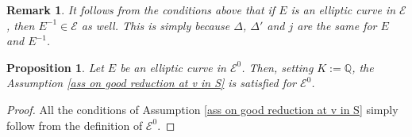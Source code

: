 \documentclass[12pt]{amsart}
\newtheorem{remark}[theorem]{Remark}
\newtheorem{proposition}[theorem]{Proposition}
\newcommand{\cE}{\mathcal{E}}
\newcommand{\Q}{\mathbb{Q}}
\numberwithin{equation}{section}
\begin{document}
\begin{remark}
    It follows from the conditions above that if $E$ is an elliptic curve in  $\cE$, then $E^{-1}\in \cE$ as well. This is simply because $\Delta$, $\Delta'$ and $j$ are the same for $E$ and $E^{-1}$. 
\end{remark}

\begin{proposition}\label{ass 2.1 is satisfied prop}
    Let $E$ be an elliptic curve in $\mathcal{E}^0$. Then, setting $K:=\Q$, the Assumption \ref{ass on good reduction at v in S} is satisfied for $\mathcal{E}^0$.
\end{proposition}
\begin{proof}
All the conditions of Assumption \ref{ass on good reduction at v in S} simply follow from the definition of $\cE^0$.
\end{proof}
\end{document}
